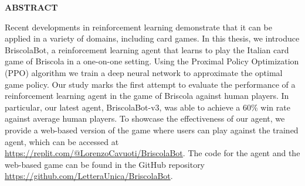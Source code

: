 \begin{center}
    \bf ABSTRACT
\end{center}
Recent developments in reinforcement learning demonstrate that it can be applied in a variety of domains, including card games. In this thesis, we introduce BriscolaBot, a reinforcement learning agent that learns to play the Italian card game of Briscola in a one-on-one setting. Using the Proximal Policy Optimization (PPO) algorithm we train a deep neural network to approximate the optimal game policy. Our study marks the first attempt to evaluate the performance of a reinforcement learning agent in the game of Briscola against human players. In particular, our latest agent, BriscolaBot-v3, was able to achieve a 60\% win rate against average human players. To showcase the effectiveness of our agent, we provide a web-based version of the game where users can play against the trained agent, which can be accessed at \url{https://replit.com/@LorenzoCavuoti/BriscolaBot}. The code for the agent and the web-based game can be found in the GitHub repository \url{https://github.com/LetteraUnica/BriscolaBot}.